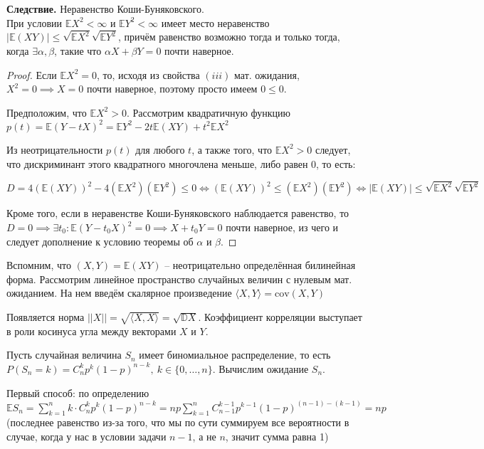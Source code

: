 \documentclass[a4paper]{article}
\begin{document}
\begin{colloq}
   	\textbf{Следствие.} Неравенство Коши-Буняковского. \\
   		При условии $\mathbb{E}X^2 < \infty$ и $\mathbb{E}Y^2 < \infty$ имеет место неравенство $\left| \mathbb{E}(XY) \right| \leqslant \sqrt{\mathbb{E}X^2} \sqrt{\mathbb{E}Y^2}$, причём равенство возможно тогда и только тогда, когда $\exists \alpha, \beta$, такие что $\alpha X + \beta Y = 0$ почти наверное.
   	
   	\begin{proof}
   		Если $\mathbb{E}X^2 = 0$, то, исходя из свойства $(iii)$ мат. ожидания, $X^2 = 0 \implies X = 0$ почти наверное,
   		поэтому просто имеем $0 \leqslant 0$.
   		
   		Предположим, что $\mathbb{E}X^2 > 0$. Рассмотрим квадратичную функцию $p(t) = \mathbb{E}(Y - tX)^2 = \mathbb{E}Y^2 - 2t \mathbb{E}(XY) + t^2 \mathbb{E}X^2$
   		
   		Из неотрицательности $p(t)$ для любого $t$, а также того, что $\mathbb{E}X^2 > 0$ следует, что дискриминант этого квадратного многочлена меньше, либо равен 0, то есть:
   		
   		$D = 4 (\mathbb{E}(XY))^2 - 4 (\mathbb{E}X^2) (\mathbb{E} Y^2) \leqslant 0 \iff (\mathbb{E}(XY))^2 \leqslant (\mathbb{E}X^2) (\mathbb{E} Y^2) \iff \left| \mathbb{E}(XY) \right| \leqslant \sqrt{\mathbb{E}X^2} \sqrt{\mathbb{E} Y^2}$
   		
   		Кроме того, если в неравенстве Коши-Буняковского наблюдается равенство, то $D = 0 \implies \exists t_0: \mathbb{E}(Y - t_0 X)^2 = 0 \implies X + t_0 Y = 0$ почти наверное, из чего и следует дополнение к условию теоремы об $\alpha$ и $\beta$.
   	\end{proof}
   	
   	Вспомним, что $(X, Y) = \mathbb{E}(XY)$ -- неотрицательно определённая билинейная форма. Рассмотрим линейное пространство случайных величин с нулевым мат. ожиданием. На нем введём скалярное произведение $\langle X, Y \rangle = \mathrm{cov}(X, Y)$
   	
   	Появляется норма $||X|| = \sqrt{\langle X, X \rangle} = \sqrt{\mathbb{D}X}$. Коэффициент корреляции выступает в роли косинуса угла между векторами $X$ и $Y$.
   	
   	\begin{example}
   		Пусть случайная величина $S_n$ имеет биномиальное распределение, то есть $P(S_n = k) = C_n^k p^k (1 - p)^{n - k},\ k \in \{0, \dots, n\}$. Вычислим ожидание $S_n$.

   		Первый способ: по определению $\mathbb{E}S_n = \sum_{k = 1}^n k \cdot C_n^k p^k (1 - p)^{n - k} = np \sum_{k = 1}^n C_{n-1}^{k-1} p^{k - 1} (1 - p)^{(n - 1) - (k - 1)} = np$ (последнее равенство из-за того, что мы по сути суммируем все вероятности в случае, когда у нас в условии задачи $n - 1$, а не $n$, значит сумма равна 1)
   			

\end{example}
\end{colloq}
\end{document}
